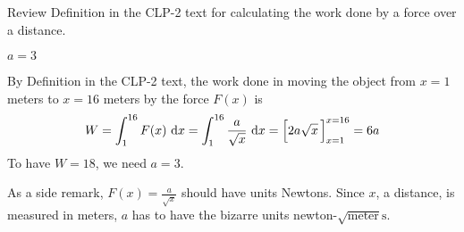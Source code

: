 \begin{hint}
Review Definition  in the
CLP-2 text for calculating the work done by a force over a distance.
\end{hint}

\begin{answer}
$a=3$
\end{answer}

\begin{solution}
By Definition  in the CLP-2 text, the work done in moving the object from $x = 1$ meters
to $x = 16$ meters by the force $F(x)$ is
\begin{align*}
W = \int_1^{16} F(x)\ \mathrm{d}x
= \int_1^{16} \frac{a}{\sqrt{x}}\ \mathrm{d}x
= \Big[2a\sqrt{x}\,\Big]_{x=1}^{x=16}
=6a
\end{align*}
To have $W=18$, we need $a=3$.

As a side remark, $F(x)= \frac{a}{\sqrt{x}}$ should have units Newtons.
Since $x$, a distance, is measured in  meters, $a$ has to have the bizarre
units newton-$\sqrt{\text{meter}}\text{s}$.
\end{solution}

